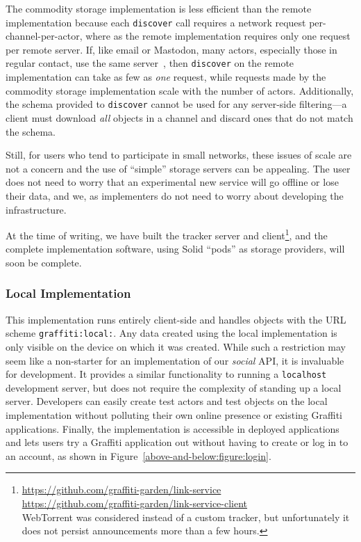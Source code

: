 The commodity storage implementation is less efficient than the remote implementation because each
\texttt{discover} call requires a network request per-channel-per-actor,
where as the remote implementation requires only one request per remote server.
If, like email or Mastodon, many actors, especially those in regular contact,
use the same server~\cite{mastodonchallenges},
then \texttt{discover} on the remote implementation can take as
few as \emph{one} request, while requests made by
the commodity storage implementation scale with the number of actors.
Additionally, the schema provided to \texttt{discover} cannot be used for any
server-side filtering---a client must download \emph{all} objects in a channel
and discard ones that do not match the schema.

Still, for users who tend to participate in small networks, these issues
of scale are not a concern and the use of ``simple'' storage servers can be appealing.
The user does not need to worry that an experimental new service
will go offline or lose their data, and we, as implementers do not need to
worry about developing the infrastructure.

At the time of writing, we have built the tracker server and client\footnote{
  \url{https://github.com/graffiti-garden/link-service}\\
  \url{https://github.com/graffiti-garden/link-service-client}\\
  WebTorrent was considered instead of a custom tracker,
  but unfortunately it does not persist announcements more than a few hours.
}, and the complete implementation software,
using Solid ``pods'' as storage providers,
will soon be complete.

\subsubsection{Local Implementation}

This implementation runs entirely client-side
and handles objects with the URL scheme \texttt{graffiti:local:}.
Any data created using the local implementation is only visible on the device on which
it was created.
While such a restriction may seem like a non-starter for an implementation
of our \emph{social} API, it is invaluable for development.
It provides a similar functionality to running a \texttt{localhost} development server,
but
does not require the complexity of standing up a local server.
Developers can easily create test actors and test objects on the local implementation
without polluting their own online presence or existing Graffiti applications.
Finally, the implementation is accessible in deployed applications
and lets users try a Graffiti application out without
having to create or log in to an account, as shown in
Figure~\ref{above-and-below:figure:login}.

